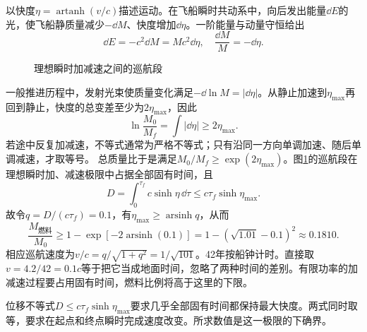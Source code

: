 \begin{solution}
以快度$\eta=\operatorname{artanh}(v/c)$描述运动。在飞船瞬时共动系中，向后发出能量$\dd E$的光，使飞船静质量减少$-\dd M$、快度增加$\dd\eta$。一阶能量与动量守恒给出
\[
 \dd E=-c^2\dd M=Mc^2\dd\eta,\quad
 \frac{\dd M}{M}=-\dd\eta.
\]

\begin{figure}[H]\centering
{}
\caption{理想瞬时加减速之间的巡航段}\label{fig:hw3-8-s}
\end{figure}

一般推进历程中，发射光束使质量变化满足$-\dd\ln M=|\dd\eta|$。从静止加速到$\eta_{\max}$再回到静止，快度的总变差至少为$2\eta_{\max}$，因此
\[
 \ln\frac{M_0}{M_f}=\int|\dd\eta|\ge2\eta_{\max}.
\]
若途中反复加减速，不等式通常为严格不等式；只有沿同一方向单调加速、随后单调减速，才取等号。
总质量比于是满足$M_0/M_f\ge\exp(2\eta_{\max})$。图\ref{fig:hw3-8-s}的巡航段在理想瞬时加、减速极限中占据全部固有时间，且
\[
 D=\int_0^{\tau_f}c\sinh\eta\,\dd\tau
 \le c\tau_f\sinh\eta_{\max}.
\]
故令$q=D/(c\tau_f)=0.1$，有$\eta_{\max}\ge\operatorname{arsinh}q$，从而
\[
 \boxed{\frac{M_{\text{燃料}}}{M_0}\ge
 1-\exp[-2\operatorname{arsinh}(0.1)]
 =1-(\sqrt{1.01}-0.1)^2\approx0.1810}.
\]
相应巡航速度为$v/c=q/\sqrt{1+q^2}=1/\sqrt{101}$。42年按船钟计时。直接取$v=4.2/42=0.1c$等于把它当成地面时间，忽略了两种时间的差别。有限功率的加减速过程要占用固有时间，燃料比例将高于这里的下限。


位移不等式$D\le c\tau_f\sinh\eta_{\max}$要求几乎全部固有时间都保持最大快度。两式同时取等，要求在起点和终点瞬时完成速度改变。所求数值是这一极限的下确界。

\end{solution}



